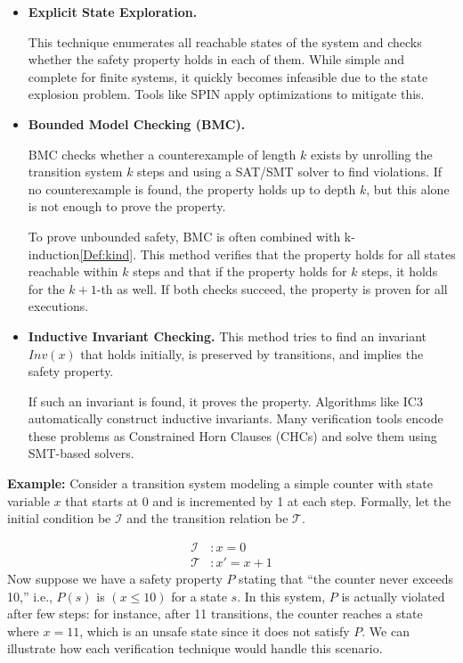 \begin{itemize}
\item\textbf{Explicit State Exploration.} 

This technique enumerates all reachable states of the system and checks whether
the safety property holds in each of them. While simple and complete for finite
systems, it quickly becomes infeasible due to the state explosion problem.
Tools like SPIN\cite{588521} apply optimizations to mitigate this.

\item\textbf{Bounded Model Checking (BMC).} 

BMC checks whether a counterexample of length \( k \) exists by unrolling the
transition system \( k \) steps and using a SAT/SMT solver to find violations.
If no counterexample is found, the property holds up to depth \( k \), but this
alone is not enough to prove the property.

To prove unbounded safety, BMC is often combined with k-induction\ref{Def:kind}. This method verifies that the property holds for all states reachable within \( k \) steps and 
that if the property holds for \( k \) steps, it holds for the \( k+1 \)-th as well.
If both checks succeed, the property is proven for all executions.

\item\textbf{Inductive Invariant Checking.} This method tries to find an invariant \( \mathit{Inv}(x) \) that holds initially, is preserved by transitions, and implies the safety property.

If such an invariant is found, it proves the property. Algorithms like IC3\cite{6148908} automatically construct inductive invariants. Many verification tools encode these problems as Constrained Horn Clauses (CHCs) and solve them using SMT-based solvers.
\end{itemize}

\noindent\textbf{Example:} Consider a transition system modeling a simple counter with state variable $x$ that starts at 0 and is incremented by 1 at each step. Formally, let the initial condition be $\mathcal{I}$ and the transition relation be $\mathcal{T}$. 

\begin{align*}
    \mathcal{I}&: x = 0 \\
    \mathcal{T}&: x' = x + 1
\end{align*}
Now suppose we have a safety property $P$ stating that “the counter never exceeds 10,” i.e., $P(s)$ is $(x \le 10)$ for a state $s$. In this system, $P$ is actually violated after few steps: for instance, after 11 transitions, the counter reaches a state where $x = 11$, which is an unsafe state since it does not satisfy $P$. We can illustrate how each verification technique would handle this scenario.

